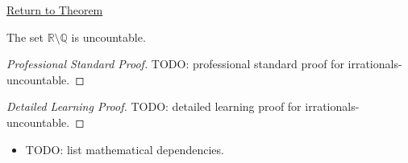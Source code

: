 \newpage
{}
\label{prf:irrationals-uncountable}

\begin{remark*}[Return]
\hyperref[thm:irrationals-uncountable]{Return to Theorem}
\end{remark*}

\begin{theorem*}
The set $\mathbb{R}\setminus\mathbb{Q}$ is uncountable.
\end{theorem*}

\begin{proof}[Professional Standard Proof]
\LRAProofBodyStart
TODO: professional standard proof for irrationals-uncountable.
\end{proof}

\begin{proof}[Detailed Learning Proof]
\LRAProofBodyStart
TODO: detailed learning proof for irrationals-uncountable.
\end{proof}

\begin{remark*}
\end{remark*}

\begin{dependencies}
\begin{itemize}
  \item TODO: list mathematical dependencies.
\end{itemize}
\end{dependencies}

\clearpage
